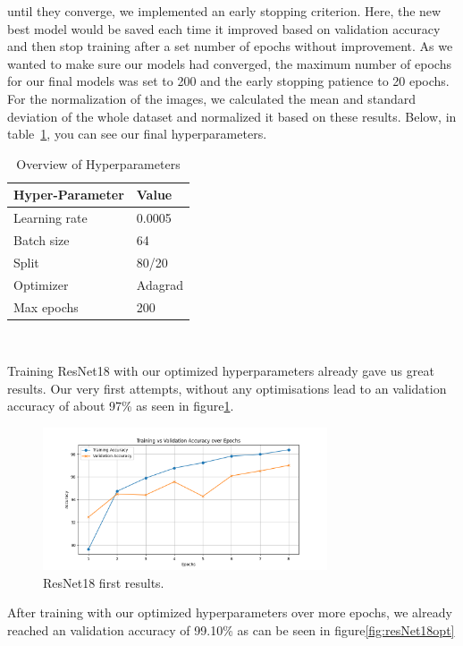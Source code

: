 until they converge, we implemented an early stopping criterion. Here, the new best model would be saved each time it improved based on validation accuracy and then stop training after a set number of epochs without improvement. As we wanted to make sure our models had converged, the maximum number of epochs for our final models was set to 200 and the early stopping patience to 20 epochs. For the normalization of the images, we calculated the mean and standard deviation of the whole dataset and normalized it based on these results. Below, in table~\ref{tab:hyperparameters}, you can see our final hyperparameters.


\begin{table}[h]
\centering
\begin{tabular}{ll}
\hline
\textbf{Hyper-Parameter} & \textbf{Value} \\
\hline
Learning rate & 0.0005 \\
Batch size & 64 \\
Split & 80/20 \\
Optimizer & Adagrad \\
Max epochs & 200 \\
\hline
\end{tabular}
\caption{Overview of Hyperparameters}~\label{tab:hyperparameters}
\end{table} 


\label{ResNet18}
Training ResNet18 with our optimized hyperparameters already gave us great results. Our very first attempts, without any optimisations lead to an validation accuracy of about 97\% as seen in figure\ref{fig:resNet18first}.
\begin{figure}[ht]
    \centering
    \includegraphics[width=0.75\textwidth]{figures/Resnet18_8_epochs.png}
    \caption{ResNet18 first results.}\label{fig:resNet18first}
\end{figure}

After training with our optimized hyperparameters over more epochs, we already reached an validation accuracy of 99.10\% as can be seen in figure\ref{fig:resNet18opt}

